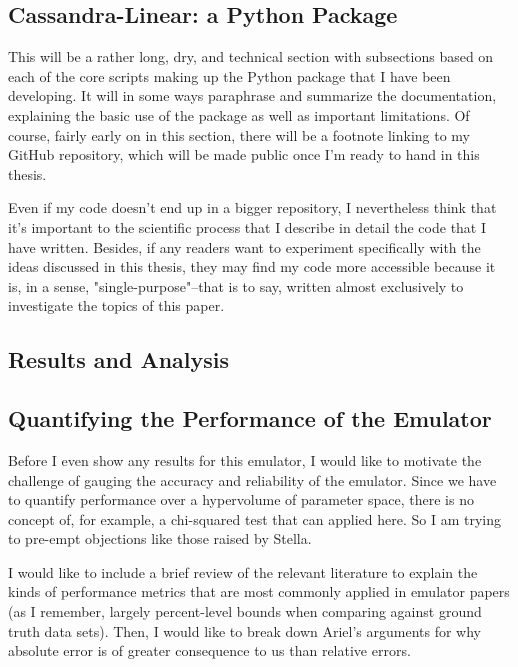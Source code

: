 \documentclass[11pt]{article}
\begin{document}
\begin{centering}
\section{Cassandra-Linear: a Python Package}
\end{centering}

This will be a rather long, dry, and technical section with subsections based on each of the core scripts making up the Python package that I have been developing. It will in some ways paraphrase and summarize the documentation, explaining the basic use of the package as well as important limitations. Of course, fairly early on in this section, there will be a footnote linking to my GitHub repository, which will be made public once I'm ready to hand in this thesis.

Even if my code doesn't end up in a bigger repository, I nevertheless think that it's important to the scientific process that I describe in detail the code that I have written. Besides, if any readers want to experiment specifically with the ideas discussed in this thesis, they may find my code more accessible because it is, in a sense, "single-purpose"--that is to say, written almost exclusively to investigate the topics of this paper.

\begin{centering}
\section{Results and Analysis}
\end{centering}

\begin{centering}
\subsection{Quantifying the Performance of the Emulator}
\end{centering}

Before I even show any results for this emulator, I would like to motivate the challenge of gauging the accuracy and reliability of the emulator. Since we have to quantify performance over a hypervolume of parameter space, there is no concept of, for example, a chi-squared test that can applied here. So I am trying to pre-empt objections like those raised by Stella.

I would like to include a brief review of the relevant literature to explain the kinds of performance metrics that are most commonly applied in emulator papers (as I remember, largely percent-level bounds when comparing against ground truth data sets). Then, I would like to break down Ariel's arguments for why absolute error is of greater consequence to us than relative errors.
\end{document}
